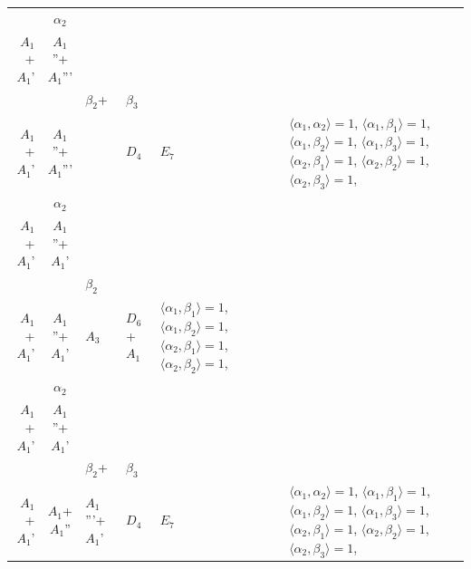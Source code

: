 \documentclass[12pt]{report}
\begin{document}
\begin{appendix}
{\begin{longtable}{rcl p{1cm}p{1cm}p{3cm} }
\\
\begin{tabular}{cc}$\alpha_1$+ & $\alpha_2$\\\tiny{ $A_1$+$A_1$' } & \tiny{ $A_1$''+$A_1$''' }\end{tabular} &\begin{tabular}{c} = \\~ \end{tabular} & \begin{tabular}{ccc}$\beta_1$+ & $\beta_2$+ & $\beta_3$\\\tiny{ $A_1$+$A_1$' } & \tiny{ $A_1$''+$A_1$''' } & \tiny{  }\end{tabular} & $D_4$ & $E_7$ & $\langle\alpha_1, \alpha_2\rangle=1$,  $\langle\alpha_1, \beta_1\rangle=1$, $\langle\alpha_1, \beta_2\rangle=1$, $\langle\alpha_1, \beta_3\rangle=1$, $\langle\alpha_2, \beta_1\rangle=1$, $\langle\alpha_2, \beta_2\rangle=1$, $\langle\alpha_2, \beta_3\rangle=1$, 
\\
\begin{tabular}{cc}$\alpha_1$+ & $\alpha_2$\\\tiny{ $A_1$+$A_1$' } & \tiny{ $A_1$''+$A_1$' }\end{tabular} &\begin{tabular}{c} = \\~ \end{tabular} & \begin{tabular}{cc}$\beta_1$+ & $\beta_2$\\\tiny{ $A_1$+$A_1$' } & \tiny{ $A_1$''+$A_1$' }\end{tabular} & $A_3$ & $D_6$+$A_1$ &  $\langle\alpha_1, \beta_1\rangle=1$, $\langle\alpha_1, \beta_2\rangle=1$, $\langle\alpha_2, \beta_1\rangle=1$, $\langle\alpha_2, \beta_2\rangle=1$, 
\\
\begin{tabular}{cc}$\alpha_1$+ & $\alpha_2$\\\tiny{ $A_1$+$A_1$' } & \tiny{ $A_1$''+$A_1$' }\end{tabular} &\begin{tabular}{c} = \\~ \end{tabular} & \begin{tabular}{ccc}$\beta_1$+ & $\beta_2$+ & $\beta_3$\\\tiny{ $A_1$+$A_1$' } & \tiny{ $A_1$+$A_1$'' } & \tiny{ $A_1$'''+$A_1$' }\end{tabular} & $D_4$ & $E_7$ & $\langle\alpha_1, \alpha_2\rangle=1$,  $\langle\alpha_1, \beta_1\rangle=1$, $\langle\alpha_1, \beta_2\rangle=1$, $\langle\alpha_1, \beta_3\rangle=1$, $\langle\alpha_2, \beta_1\rangle=1$, $\langle\alpha_2, \beta_2\rangle=1$, $\langle\alpha_2, \beta_3\rangle=1$, 

\end{longtable}}
\end{appendix}
\end{document}
